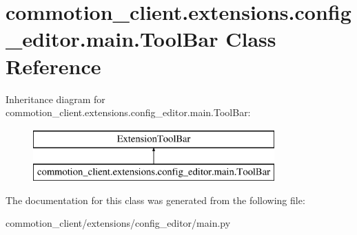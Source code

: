 \hypertarget{classcommotion__client_1_1extensions_1_1config__editor_1_1main_1_1ToolBar}{\section{commotion\-\_\-client.\-extensions.\-config\-\_\-editor.\-main.\-Tool\-Bar Class Reference}
\label{classcommotion__client_1_1extensions_1_1config__editor_1_1main_1_1ToolBar}
}
Inheritance diagram for commotion\-\_\-client.\-extensions.\-config\-\_\-editor.\-main.\-Tool\-Bar\-:\begin{figure}[H]
\begin{center}
\leavevmode
\includegraphics[height=2.000000cm]{classcommotion__client_1_1extensions_1_1config__editor_1_1main_1_1ToolBar}
\end{center}
\end{figure}


The documentation for this class was generated from the following file\-:\begin{DoxyCompactItemize}
\item 
commotion\-\_\-client/extensions/config\-\_\-editor/main.\-py\end{DoxyCompactItemize}
